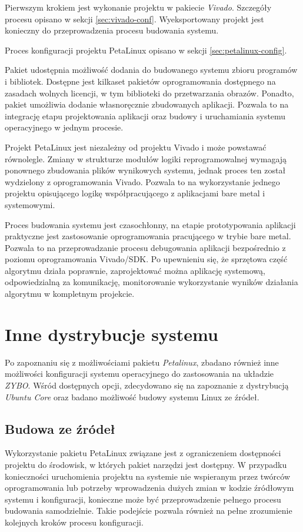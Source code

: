 Pierwszym krokiem jest wykonanie projektu w pakiecie \emph{Vivado}. Szczegóły procesu opisano w sekcji \ref{sec:vivado-conf}. Wyeksportowany projekt jest konieczny do przeprowadzenia procesu budowania systemu.

Proces konfiguracji projektu PetaLinux opisano w sekcji \ref{sec:petalinux-config}.

Pakiet udostępnia możliwość dodania do budowanego systemu zbioru programów i bibliotek. Dostępne jest kilkaset pakietów oprogramowania dostępnego na zasadach wolnych licencji, w tym biblioteki do przetwarzania obrazów. Ponadto, pakiet umożliwia dodanie własnoręcznie zbudowanych aplikacji. Pozwala to na integrację etapu projektowania aplikacji oraz budowy i uruchamiania systemu operacyjnego w jednym procesie.

Projekt PetaLinux jest niezależny od projektu Vivado i może powstawać równolegle. Zmiany w strukturze modułów logiki reprogramowalnej wymagają ponownego zbudowania plików wynikowych systemu, jednak proces ten został wydzielony z oprogramowania Vivado. Pozwala to na wykorzystanie jednego projektu opisującego logikę współpracującego z aplikacjami bare metal i systemowymi. 

Proces budowania systemu jest czasochłonny, na etapie prototypowania aplikacji praktyczne jest zastosowanie oprogramowania pracującego w trybie bare metal. Pozwala to na przeprowadzanie procesu debugowania aplikacji bezpośrednio z poziomu oprogramowania Vivado/SDK. Po upewnieniu się, że sprzętowa część algorytmu działa poprawnie, zaprojektować można aplikację systemową, odpowiedzialną za komunikację, monitorowanie wykorzystanie wyników działania algorytmu w kompletnym projekcie.

\section{Inne dystrybucje systemu}
Po zapoznaniu się z możliwościami pakietu \emph{Petalinux}, zbadano również inne możliwości konfiguracji systemu operacyjnego do zastosowania na układzie \emph{ZYBO}. Wśród dostępnych opcji, zdecydowano się na zapoznanie z dystrybucją \emph{Ubuntu Core} oraz badano możliwość budowy systemu Linux ze źródeł.

\subsection{Budowa ze źródeł}
Wykorzystanie pakietu PetaLinux związane jest z ograniczeniem dostępności projektu do środowisk, w których pakiet narzędzi jest dostępny. W przypadku konieczności uruchomienia projektu na systemie nie wspieranym przez twórców oprogramowania lub potrzeby wprowadzenia dużych zmian w kodzie źródłowym systemu i konfiguracji, konieczne może być przeprowadzenie pełnego procesu budowania samodzielnie. Takie podejście pozwala również na pełne zrozumienie kolejnych kroków procesu konfiguracji.

